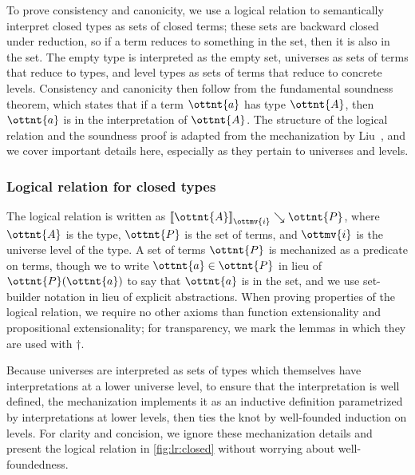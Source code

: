 \documentclass[a4paper,UKenglish,cleveref,autoref,thm-restate]{lipics-v2021}
\newcommand{\citep}[1]{\cite{#1}}
\begin{document}
To prove consistency and canonicity,
we use a logical relation to semantically interpret closed types as sets of closed terms;
these sets are backward closed under reduction,
so if a term reduces to something in the set, then it is also in the set.
The empty type is interpreted as the empty set,
universes as sets of terms that reduce to types,
and level types as sets of terms that reduce to concrete levels.
Consistency and canonicity then follow from the fundamental soundness theorem,
which states that if a term $\ottnt{a}$ has type $\ottnt{A}$,
then $\ottnt{a}$ is in the interpretation of $\ottnt{A}$.
The structure of the logical relation and the soundness proof
is adapted from the mechanization by Liu~\citep{lr-pearl},
and we cover important details here,
especially as they pertain to universes and levels.

\subsubsection{Logical relation for closed types}

The logical relation is written as $ \mathopen{\llbracket}  \ottnt{A}  \mathclose{\rrbracket}_{ \ottmv{i} } \searrow  \ottnt{P} $,
where $\ottnt{A}$ is the type, $\ottnt{P}$ is the set of terms,
and $\ottmv{i}$ is the universe level of the type.
A set of terms $\ottnt{P}$ is mechanized as a predicate on terms,
though we to write $ \ottnt{a}  \in  \ottnt{P} $ in lieu of $\ottnt{P}(\ottnt{a})$
to say that $\ottnt{a}$ is in the set,
and we use set-builder notation in lieu of explicit abstractions.
When proving properties of the logical relation,
we require no other axioms than function extensionality and propositional extensionality;
for transparency, we mark the lemmas in which they are used with $\dagger$.

Because universes are interpreted as sets of types
which themselves have interpretations at a lower universe level,
to ensure that the interpretation is well defined,
the mechanization implements it as an inductive definition
parametrized by interpretations at lower levels,
then ties the knot by well-founded induction on levels.
For clarity and concision, we ignore these mechanization details
and present the logical relation in \cref{fig:lr:closed}
without worrying about well-foundedness.
\end{document}
